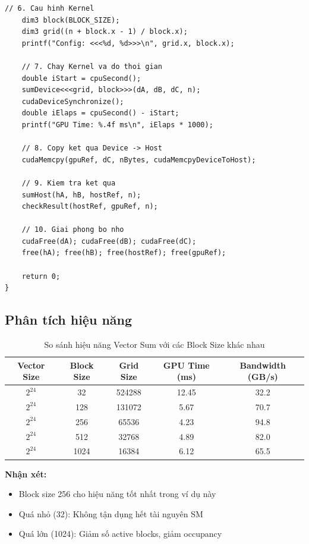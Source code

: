 \begin{lstlisting}[caption={Chương trình Vector Sum đầy đủ}, label={lst:vector_sum_full}]
    // 6. Cau hinh Kernel
    dim3 block(BLOCK_SIZE);
    dim3 grid((n + block.x - 1) / block.x);
    printf("Config: <<<%d, %d>>>\n", grid.x, block.x);

    // 7. Chay Kernel va do thoi gian
    double iStart = cpuSecond();
    sumDevice<<<grid, block>>>(dA, dB, dC, n);
    cudaDeviceSynchronize();
    double iElaps = cpuSecond() - iStart;
    printf("GPU Time: %.4f ms\n", iElaps * 1000);

    // 8. Copy ket qua Device -> Host
    cudaMemcpy(gpuRef, dC, nBytes, cudaMemcpyDeviceToHost);

    // 9. Kiem tra ket qua
    sumHost(hA, hB, hostRef, n);
    checkResult(hostRef, gpuRef, n);

    // 10. Giai phong bo nho
    cudaFree(dA); cudaFree(dB); cudaFree(dC);
    free(hA); free(hB); free(hostRef); free(gpuRef);

    return 0;
}
\end{lstlisting}

\subsection{Phân tích hiệu năng}

\begin{table}[H]
\centering
\caption{So sánh hiệu năng Vector Sum với các Block Size khác nhau}
\label{tab:vector_sum_perf}
\begin{tabular}{@{}ccccc@{}}
\toprule
\textbf{Vector Size} & \textbf{Block Size} & \textbf{Grid Size} & \textbf{GPU Time (ms)} & \textbf{Bandwidth (GB/s)} \\
\midrule
$2^{24}$ & 32 & 524288 & 12.45 & 32.2 \\
$2^{24}$ & 128 & 131072 & 5.67 & 70.7 \\
$2^{24}$ & 256 & 65536 & 4.23 & 94.8 \\
$2^{24}$ & 512 & 32768 & 4.89 & 82.0 \\
$2^{24}$ & 1024 & 16384 & 6.12 & 65.5 \\
\bottomrule
\end{tabular}
\end{table}

\textbf{Nhận xét:}
\begin{itemize}
    \item Block size 256 cho hiệu năng tốt nhất trong ví dụ này
    \item Quá nhỏ (32): Không tận dụng hết tài nguyên SM
    \item Quá lớn (1024): Giảm số active blocks, giảm occupancy
\end{itemize}

